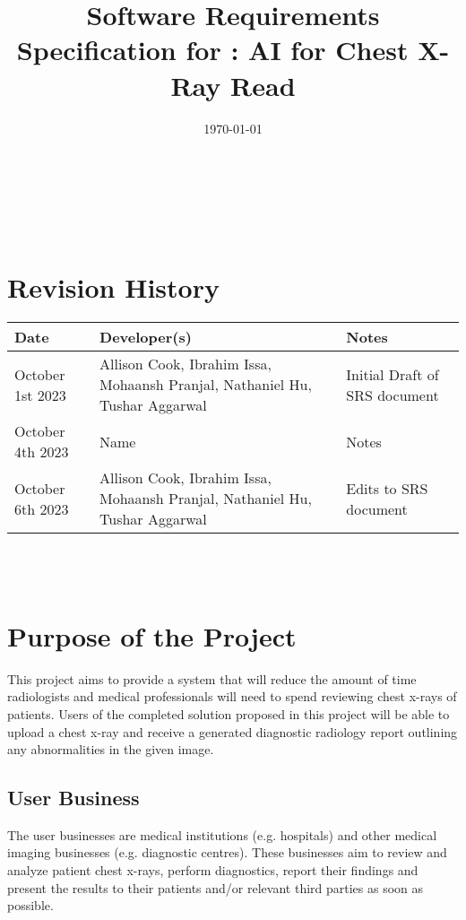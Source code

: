 \documentclass[12pt]{article}
\begin{document}
\title{Software Requirements Specification for \progname: AI for Chest X-Ray Read}
\author{\authname}
\date{\today}
  
\maketitle

~\newpage


\tableofcontents

~\newpage

\section*{Revision History}

\begin{tabularx}{\textwidth}{p{4cm}p{4cm}X}
\toprule {\textbf{Date}} & {\textbf{Developer(s)}} & {\textbf{Notes}}\\
\midrule
October 1st 2023 & Allison Cook, Ibrahim Issa, Mohaansh Pranjal, Nathaniel Hu, Tushar Aggarwal & Initial Draft of SRS document \\
October 4th 2023 & Name & Notes\\
October 6th 2023 & Allison Cook, Ibrahim Issa, Mohaansh Pranjal, Nathaniel Hu, Tushar Aggarwal  & Edits to SRS document \\
\bottomrule
\end{tabularx}

~\\

~\newpage
\section{Purpose of the Project}
This project aims to provide a system that will reduce the amount of time radiologists and medical professionals will need to spend reviewing chest x-rays of patients. Users of the completed solution proposed in this project will be able to upload a chest x-ray and receive a generated diagnostic radiology report outlining any abnormalities in the given image.

\subsection{User Business}
The user businesses are medical institutions (e.g. hospitals) and other medical imaging businesses (e.g. diagnostic centres). These businesses aim to review and analyze patient chest x-rays, perform diagnostics, report their findings and present the results to their patients and/or relevant third parties as soon as possible. 
\end{document}
